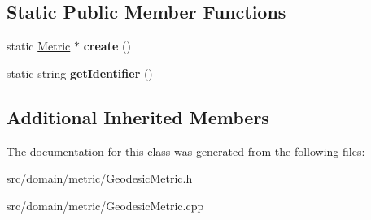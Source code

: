\subsection*{Static Public Member Functions}
\begin{DoxyCompactItemize}
\item 
\hypertarget{class_geodesic_metric_a389074cfb665370b570fd57f7ab83df8}{}static \hyperlink{class_metric}{Metric} $\ast$ {\bfseries create} ()\label{class_geodesic_metric_a389074cfb665370b570fd57f7ab83df8}

\item 
\hypertarget{class_geodesic_metric_ad0a874b2bc7f683685add0e1049361ab}{}static string {\bfseries get\+Identifier} ()\label{class_geodesic_metric_ad0a874b2bc7f683685add0e1049361ab}

\end{DoxyCompactItemize}
\subsection*{Additional Inherited Members}


The documentation for this class was generated from the following files\+:\begin{DoxyCompactItemize}
\item 
src/domain/metric/Geodesic\+Metric.\+h\item 
src/domain/metric/Geodesic\+Metric.\+cpp\end{DoxyCompactItemize}
